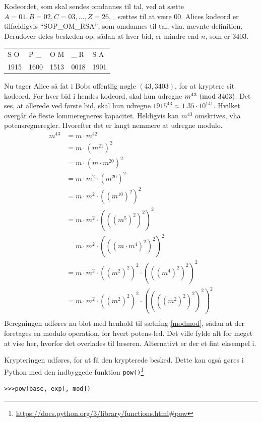 \begin{eks}
    Kodeordet, som skal sendes omdannes til tal, ved at sætte \(A=01, B=02, C=03, \hdots , Z=26\), \(\_\) sættes til at være 00.
    Alices kodeord er tilfældigvis ``SOP\_OM\_RSA'', som omdannes til tal, vha. nævnte definition.
    Derudover deles beskeden op, sådan at hver bid, er mindre end \(n\), som er 3403.
    \begin{center}
        \begin{tabular}{l l l l l}
            S O  & P \_  & O M  & \_ R  & S A\\
            1915 & 1600  & 1513  & 0018   & 1901\\
        \end{tabular}
    \end{center}

    Nu tager Alice så fat i Bobs offentlig nøgle \((43, 3403)\), for at kryptere sit kodeord.
    For hver bid i hendes kodeord, skal hun udregne \(m^{43} \ (\mathrm{mod}\ 3403)\).
    Det ses, at allerede ved første bid, skal hun udregne \(1915^{43} \approx 1.35 \cdot 10^{141}\).
    Hvilket overgår de fleste lommeregneres kapacitet.
    Heldigvis kan \(m^{43}\) omskrives, vha potensregneregler. Hvorefter det er langt nemmere at udregne modulo.
    \begin{align*}
        m^{43} &= m \cdot m^{42}\\
        &= m \cdot (m^{21})^2\\
        &= m \cdot (m \cdot m^{20})^2\\
        &= m \cdot m^2 \cdot (m^{20})^2\\
        &= m \cdot m^2 \cdot ((m^{10})^2)^2\\
        &= m \cdot m^2 \cdot (((m^5)^2)^2)^2\\
        &= m \cdot m^2 \cdot (((m \cdot m^4)^2)^2)^2\\
        &= m \cdot m^2 \cdot ((m^2)^2)^2 \cdot (((m^4)^2)^2)^2\\
        &= m \cdot m^2 \cdot ((m^2)^2)^2 \cdot ((((m^2)^2)^2)^2)^2\\
    \end{align*}
    Beregningen udføres nu blot med henhold til sætning \ref{modmod}, sådan at der foretages en modulo operation, for hvert potens-led.
    Det ville fylde alt for meget at vise her, hvorfor det overlades til læseren. Alternativt er der et fint eksempel i. \cite[104]{krypto}
    \par
    Krypteringen udføres, for at få den krypterede besked.
    Dette kan også gøres i Python med den indbyggede funktion \texttt{pow()}\footnote{\url{https://docs.python.org/3/library/functions.html\#pow}}
    \begin{verbatim}
>>>pow(base, exp[, mod])
    \end{verbatim}


\end{eks}
